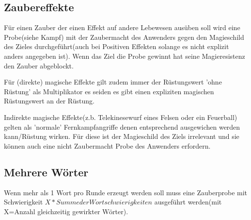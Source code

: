 \subsection{Zaubereffekte}
Für einen Zauber der einen Effekt auf andere Lebewesen ausüben soll wird eine Probe(siehe Kampf) mit der Zaubermacht des Anwenders gegen den Magieschild des Zieles durchgeführt(auch bei Positiven Effekten solange es nicht explizit anders angegeben ist).
Wenn das Ziel die Probe gewinnt hat seine Magieresistenz den Zauber abgeblockt.

Für (direkte) magische Effekte gilt zudem immer der Rüstungswert 'ohne Rüstung' als Multiplikator es seiden es gibt einen expliziten magischen Rüstungswert an der Rüstung.

Indirekte magische Effekte(z.b. Telekinesewurf eines Felsen oder ein Feuerball) gelten als 'normale' Fernkampfangriffe denen entsprechend ausgewichen werden kann/Rüstung wirken. Für diese ist der Magieschild des Ziels irrelevant und sie können auch eine nicht Zaubermacht Probe des Anwenders erfordern.

\subsection{Mehrere Wörter}
Wenn mehr als 1 Wort pro Runde erzeugt werden soll muss eine Zauberprobe mit Schwierigkeit $X*Summe der Wortschwierigkeiten$ ausgeführt werden(mit X=Anzahl gleichzeitig gewirkter Wörter).

